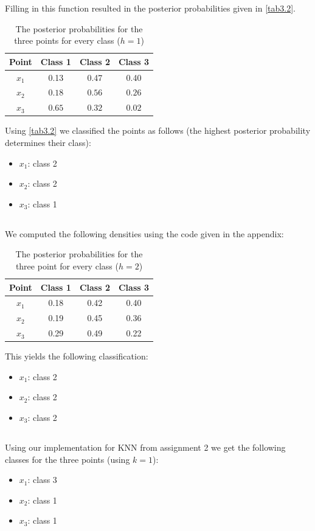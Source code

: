 \documentclass[10pt]{article}
\begin{document}
Filling in this function resulted in the posterior probabilities given in \autoref{tab3.2}.
\begin{table}[H]
 \centering
 \caption{The posterior probabilities for the three points for every class ($h=1$)}
 \begin{tabular}{c|c|c|c}
  Point & Class 1 & Class 2 & Class 3 \\
  \hline
  $x_1$ & 0.13 & 0.47 & 0.40 \\
  $x_2$ & $0.18$ & $0.56$ & $0.26$ \\
  $x_3$ & $0.65$ & $0.32$ & $0.02$ \\
 \end{tabular}
 \label{tab3.2}
\end{table}
Using \autoref{tab3.2} we classified the points as follows (the highest posterior probability determines their class):
\begin{itemize}
 \item $x_1$: class 2
 \item $x_2$: class 2
 \item $x_3$: class 1
\end{itemize}

\subsection{}
We computed the following densities using the code given in the appendix:
\begin{table}[H]
 \centering
 \caption{The posterior probabilities for the three point for every class ($h=2$)}
 \begin{tabular}{c|c|c|c}
  Point & Class 1 & Class 2 & Class 3 \\
  \hline
  $x_1$ & 0.18 & 0.42 & 0.40 \\
  $x_2$ & 0.19 & 0.45 & 0.36 \\
  $x_3$ & 0.29 & 0.49 & 0.22 \\
 \end{tabular}
 \label{tab3.3}
\end{table}
This yields the following classification:
\begin{itemize}
 \item $x_1$: class 2
 \item $x_2$: class 2
 \item $x_3$: class 2
\end{itemize}

\subsection{}
Using our implementation for KNN from assignment 2 we get the following classes for the three points (using $k=1$):
\begin{itemize}
 \item $x_1$: class 3
 \item $x_2$: class 1
 \item $x_3$: class 1
\end{itemize}
\end{document}
